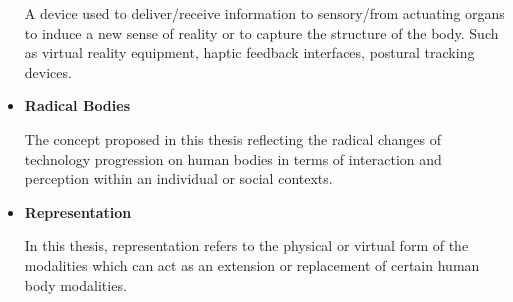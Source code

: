 \begin{itemize}
A device used to deliver/receive information to sensory/from actuating organs to induce a new sense of reality or to capture the structure of the body. Such as virtual reality equipment, haptic feedback interfaces, postural tracking devices.

\item \textbf{Radical Bodies}

The concept proposed in this thesis reflecting the radical changes of technology progression on human bodies in terms of interaction and perception within an individual or social contexts.

\item \textbf{Representation}

In this thesis, representation refers to the physical or virtual form of the modalities which can act as an extension or replacement of certain human body modalities. %

\end{itemize}


%
%